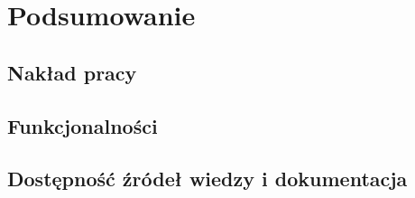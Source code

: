 \chapter{Podsumowanie}

\section{Nakład pracy}
\section{Funkcjonalności}
\section{Dostępność źródeł wiedzy i dokumentacja}